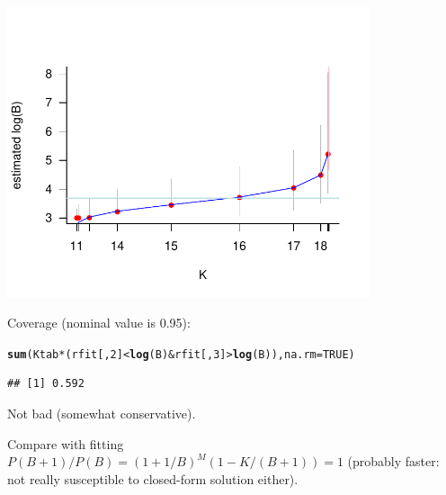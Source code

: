 \documentclass{article}\usepackage[]{graphicx}\usepackage[]{color}
\makeatletter
\newcommand{\hlnum}[1]{\textcolor[rgb]{0.686,0.059,0.569}{#1}}%
\newcommand{\hlopt}[1]{\textcolor[rgb]{0,0,0}{#1}}%
\newcommand{\hlstd}[1]{\textcolor[rgb]{0.345,0.345,0.345}{#1}}%
\newcommand{\hlkwc}[1]{\textcolor[rgb]{0.333,0.667,0.333}{#1}}%
\newcommand{\hlkwd}[1]{\textcolor[rgb]{0.737,0.353,0.396}{\textbf{#1}}}%
\newenvironment{kframe}{%
 \def\at@end@of@kframe{}%
 \ifinner\ifhmode%
  \def\at@end@of@kframe{\end{minipage}}%
  \begin{minipage}{\columnwidth}%
 \fi\fi%
 \def\FrameCommand##1{\hskip\@totalleftmargin \hskip-\fboxsep
 \colorbox{shadecolor}{##1}\hskip-\fboxsep
     \hskip-\linewidth \hskip-\@totalleftmargin \hskip\columnwidth}%
 \MakeFramed {\advance\hsize-\width
   \@totalleftmargin\z@ \linewidth\hsize
   \@setminipage}}%
 {\par\unskip\endMakeFramed%
 \at@end@of@kframe}
\newenvironment{knitrout}{}{} %
\makeatother
\begin{document}
\begin{knitrout}
\color{fgcolor}
\includegraphics[width=0.8\textwidth]{figure/coverplot-1} 

\end{knitrout}

Coverage (nominal value is 0.95):
\begin{knitrout}
\color{fgcolor}\begin{kframe}
\begin{alltt}
\hlkwd{sum}\hlstd{(Ktab}\hlopt{*}\hlstd{(rfit[,}\hlnum{2}\hlstd{]}\hlopt{<}\hlkwd{log}\hlstd{(B)} \hlopt{&} \hlstd{rfit[,}\hlnum{3}\hlstd{]}\hlopt{>}\hlkwd{log}\hlstd{(B)),}\hlkwc{na.rm}\hlstd{=}\hlnum{TRUE}\hlstd{)}
\end{alltt}
\begin{verbatim}
## [1] 0.592
\end{verbatim}
\end{kframe}
\end{knitrout}
Not bad (somewhat conservative).

Compare with fitting $P(B+1)/P(B) = ( 1+ 1/B )^M (1-K/(B+1))=1$
(probably faster: not really susceptible to closed-form solution either).
\end{document}
